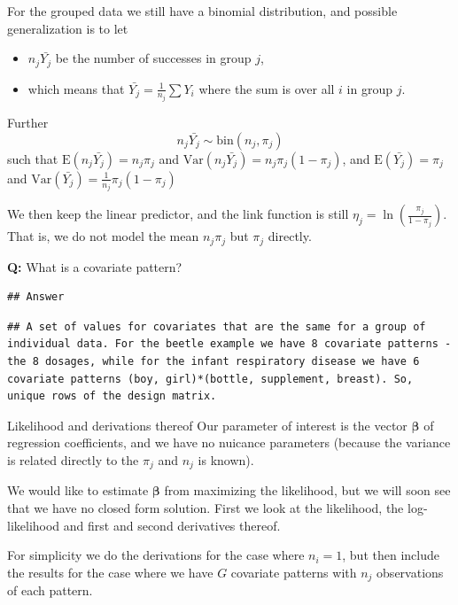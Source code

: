 \documentclass[
  ignorenonframetext,
]{beamer}
\providecommand{\tightlist}{%
  \setlength{\itemsep}{0pt}\setlength{\parskip}{0pt}}
\begin{document}
\begin{frame}[fragile]
For the grouped data we still have a binomial distribution, and possible
generalization is to let

\begin{itemize}
\tightlist
\item
  \(n_j\bar{Y_j}\) be the number of successes in group \(j\),
\item
  which means that \(\bar{Y_j}=\frac{1}{n_j}\sum Y_i\) where the sum is
  over all \(i\) in group \(j\).
\end{itemize}

Further \[ n_j\bar{Y_j} \sim \text{bin}(n_j,\pi_j)\] such that
\(\text{E}(n_j\bar{Y_j})=n_j \pi_j\) and
\(\text{Var}(n_j\bar{Y_j})=n_j \pi_j(1-\pi_j)\), and
\(\text{E}(\bar{Y_j})=\pi_j\) and
\(\text{Var}(\bar{Y_j})=\frac{1}{n_j} \pi_j(1-\pi_j)\)

We then keep the linear predictor, and the link function is still
\(\eta_j=\ln(\frac{\pi_j}{1-\pi_j})\). That is, we do not model the mean
\(n_j \pi_j\) but \(\pi_j\) directly.

\textbf{Q:} What is a covariate pattern?

\begin{verbatim}
## Answer
\end{verbatim}

\begin{verbatim}
## A set of values for covariates that are the same for a group of individual data. For the beetle example we have 8 covariate patterns - the 8 dosages, while for the infant respiratory disease we have 6 covariate patterns (boy, girl)*(bottle, supplement, breast). So, unique rows of the design matrix.
\end{verbatim}
\end{frame}

\begin{frame}{Likelihood and derivations thereof}
\protect\hypertarget{likelihood-and-derivations-thereof}{}
Our parameter of interest is the vector \(\boldsymbol{\beta}\) of
regression coefficients, and we have no nuicance parameters (because the
variance is related directly to the \(\pi_j\) and \(n_j\) is known).

We would like to estimate \(\boldsymbol{\beta}\) from maximizing the
likelihood, but we will soon see that we have no closed form solution.
First we look at the likelihood, the log-likelihood and first and second
derivatives thereof.

For simplicity we do the derivations for the case where \(n_i=1\), but
then include the results for the case where we have \(G\) covariate
patterns with \(n_j\) observations of each pattern.
\end{frame}
\end{document}
